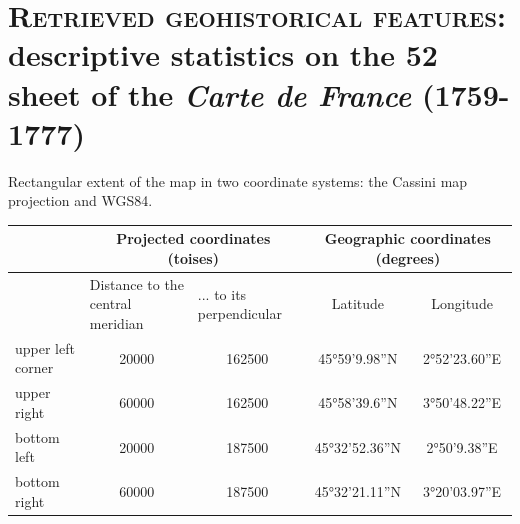 \documentclass[portrait,a0]{sciposter}
\begin{document}
\vspace{-1cm}
\begin{minipage}[b]{\textwidth}
  \section{\normalfont \textsc{Retrieved geohistorical features}: descriptive statistics on the 52 sheet of the \textit{Carte de France} (1759-1777)}
  \begin{multicols}{3}
    \setlength{\columnsep}{80pt}
    \footnotesize
    \begin{center}
      \captionsetup{type=table}
      \caption{Rectangular extent of the map in two coordinate systems: the Cassini map projection and WGS84.}
      \label{table:translation}
      \begin{tabular}{@{}lcccc@{}}
        \toprule
        & \multicolumn{2}{c}{Projected coordinates (toises)}                                                & \multicolumn{2}{c}{Geographic coordinates (degrees)}              \\
        \midrule
        & \multicolumn{1}{l}{Distance to the central meridian} & \multicolumn{1}{l}{... to its perpendicular} & \multicolumn{1}{c}{Latitude} & \multicolumn{1}{c}{Longitude} \\
        upper left corner & \num{20000}                                          & \num{162500}                                 & 45°59'9.98''N                & 2°52'23.60''E                 \\
        upper right       & \num{60000}                                          & \num{162500}                                 & 45°58'39.6''N                & 3°50'48.22''E                 \\
        bottom left      & \num{20000}                                        & \num{187500}                                & 45°32'52.36''N               & 2°50'9.38''E                  \\
        bottom right     & \num{60000}                                          & \num{187500}                                & 45°32'21.11''N               & 3°20'03.97''E                 \\
        \bottomrule
      \end{tabular}
    \end{center}
    \vfill    
    
    

\end{multicols}
\end{minipage}
\end{document}
